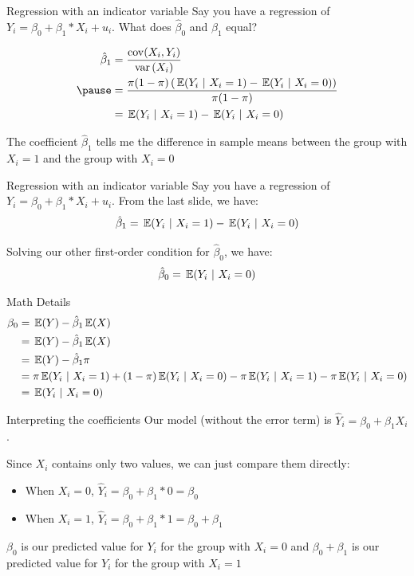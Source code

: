 \documentclass[aspectratio=169,t,11pt,table]{beamer}
\begin{document}
\begin{frame}{Regression with an indicator variable}
  Say you have a regression of $Y_i = \beta_0 + \beta_1 * X_i + u_i$. What does $\hat{\beta}_0$ and $\hat{\beta}_1$ equal?

  \begin{align*}
    \hat{\beta}_1 
    &= \frac{\cov(X_i, Y_i)}{\var{X_i}} \\ \pause
    &= \frac{\pi (1 - \pi) \left( \expec{Y_i}{X_i = 1} - \expec{Y_i}{X_i = 0} \right)}{\pi (1 - \pi)} \\
    &= \expec{Y_i}{X_i = 1} - \expec{Y_i}{X_i = 0}
  \end{align*}
  
  The coefficient $\hat{\beta}_1$ tells me the difference in sample means between the group with $X_i = 1$ and the group with $X_i = 0$
\end{frame}

\begin{frame}{Regression with an indicator variable}
  Say you have a regression of $Y_i = \beta_0 + \beta_1 * X_i + u_i$. From the last slide, we have:
  $$ 
    \hat{\beta}_1 = \expec{Y_i}{X_i = 1} - \expec{Y_i}{X_i = 0} 
  $$

  \bigskip
  Solving our other first-order condition for $\hat{\beta}_0$, we have:
  \begin{align*}
    \hat{\beta}_0 = \expec{Y_i}{X_i = 0}
  \end{align*}
\end{frame}

\begin{frame}{Math Details}
  \begin{align*}
    \beta_0 &= \expec{Y} - \hat{\beta}_1 \expec{X} \\
    &= \expec{Y} - \hat{\beta}_1 \expec{X} \\
    &= \expec{Y} - \hat{\beta}_1 \pi \\
    &= \pi \expec{Y_i}{X_i = 1} + (1 - \pi) \expec{Y_i}{X_i = 0} - \pi \expec{Y_i}{X_i = 1} - \pi \expec{Y_i}{X_i = 0} \\
    &= \expec{Y_i}{X_i = 0}
  \end{align*}
\end{frame}

\begin{frame}{Interpreting the coefficients}
  Our model (without the error term) is $\hat{Y}_i = \beta_0 + \beta_1 X_i$.

  \bigskip
  Since $X_i$ contains only two values, we can just compare them directly:
  \begin{itemize}
    \item When $X_i = 0$, $\hat{Y}_i = \beta_0 + \beta_1 * 0 = \beta_0$
    
    \pause
    \item When $X_i = 1$, $\hat{Y}_i = \beta_0 + \beta_1 * 1 = \beta_0 + \beta_1$
  \end{itemize}

  \bigskip
  $\beta_0$ is our predicted value for $Y_i$ for the group with $X_i = 0$ and $\beta_0 + \beta_1$ is our predicted value for $Y_i$ for the group with $X_i = 1$ 
\end{frame}
\end{document}
